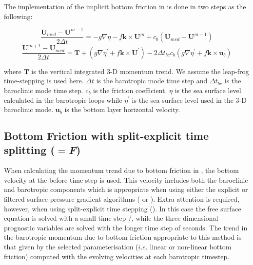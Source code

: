 \documentclass[NEMO_book]{subfiles}
\begin{document}
The implementation of the implicit bottom friction in  is done in two steps as the
following:

\begin{equation} \label{Eq_dynspg_ts_bfr1}
\frac{\textbf{U}_{med}-\textbf{U}^{m-1}}{2\Delta t}=-g\nabla\eta-f\textbf{k}\times\textbf{U}^{m}+c_{b}
\left(\textbf{U}_{med}-\textbf{U}^{m-1}\right)
\end{equation}
\begin{equation} \label{Eq_dynspg_ts_bfr2}
\frac{\textbf{U}^{m+1}-\textbf{U}_{med}}{2\Delta t}=\textbf{T}+
\left(g\nabla\eta^{'}+f\textbf{k}\times\textbf{U}^{'}\right)-
2\Delta t_{bc}c_{b}\left(g\nabla\eta^{'}+f\textbf{k}\times\textbf{u}_{b}\right)
\end{equation}

where $\textbf{T}$ is the vertical integrated 3-D momentum trend. We assume the leap-frog time-stepping
is used here. $\Delta t$ is the barotropic mode time step and $\Delta t_{bc}$ is the baroclinic mode time step.
 $c_{b}$ is the friction coefficient. $\eta$ is the sea surface level calculated in the barotropic loops
while $\eta^{'}$ is the sea surface level used in the 3-D baroclinic mode. $\textbf{u}_{b}$ is the bottom
layer horizontal velocity.




\subsection{Bottom Friction with split-explicit time splitting ($=$\textit{F})}
\label{ZDF_bfr_ts}

When calculating the momentum trend due to bottom friction in , the
bottom velocity at the before time step is used. This velocity includes both the
baroclinic and barotropic components which is appropriate when using either the
explicit or filtered surface pressure gradient algorithms ( or 
). Extra attention is required, however, when using 
split-explicit time stepping (). In this case the free surface 
equation is solved with a small time step /, while the three 
dimensional prognostic variables are solved with the longer time step 
of  seconds. The trend in the barotropic momentum due to bottom 
friction appropriate to this method is that given by the selected parameterisation 
($i.e.$ linear or non-linear bottom friction) computed with the evolving velocities 
at each barotropic timestep. 
\end{document}

